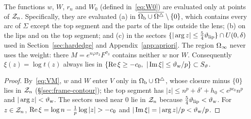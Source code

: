 \begin{lemma}\label{lem:weightdomain}
The functions $w$, $W$, $r_n$ and $W_0$ (defined in~\eqref{eq:W0}) are evaluated only at points of $\mathcal{Z}_n$. Specifically,
they are evaluated (a) in $\overline{\Omega_{\mathrm{b}}\cup\Omega^{\triangle}}\setminus\{0\}$, which contains every arc of $\Sigma$ except the top
segment and the parts of the lips outside the lens; (b) on the lips and on the top segment; and (c) in the sectors
$\{|\arg z|\le\frac54\vartheta_{\mathrm{lip}}\}\cap U(0,\delta)$ used in Section~\ref{sec:hardedge} and Appendix~\ref{app:apriori}. The
region $\Omega_{\infty}$ never uses the weight: there $M=e^{n\varphi\sigma_3}F^{\sigma_3}$ contains neither $w$ nor $W$.
Consequently $\xi(z)=\log t(z)$ always lies in $\{\re\xi\ge-c_0,\ |\im\xi|\le\thw/p\}\subset S_\vartheta$.
\end{lemma}

\begin{proof}
By~\eqref{eq:VM}, $w$ and $W$ enter $V$ only in $\Omega_{\mathrm{b}}\cup\Omega^{\triangle}$, whose closure minus $\{0\}$ lies in $\mathcal{Z}_n$
(\S\ref{sec:frame-contour}); the top segment has $|z|\le n^p+\delta'+h_0<e^{pc_0}n^p$ and $|\arg z|<\vartheta_{\mathrm{w}}$. The sectors
used near $0$ lie in $\mathcal{Z}_n$ because $\frac54\vartheta_{\mathrm{lip}}<\vartheta_{\mathrm{w}}$. For $z\in\mathcal{Z}_n$, $\re\xi=\log n-\frac1p\log|z|>-c_0$ and
$|\operatorname{Im}\xi|=|\arg z|/p<\vartheta_{\mathrm{w}}/p$.
\end{proof}

